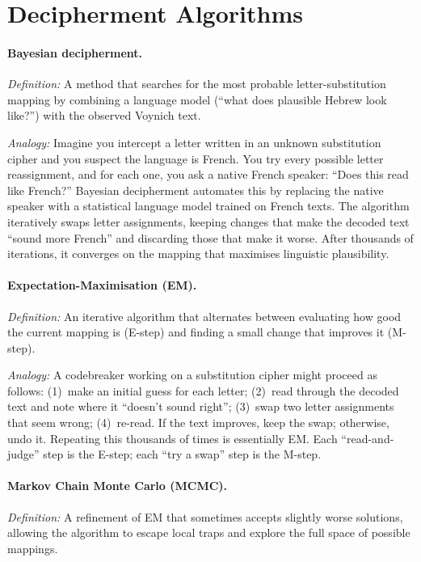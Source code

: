\documentclass[11pt,a4paper]{article}
\begin{document}
\section{Decipherment Algorithms}

\paragraph{Bayesian decipherment.}
\textit{Definition:} A method that searches for the most probable letter-substitution mapping by combining a language model (``what does plausible Hebrew look like?'') with the observed Voynich text.

\textit{Analogy:} Imagine you intercept a letter written in an unknown substitution cipher and you suspect the language is French.  You try every possible letter reassignment, and for each one, you ask a native French speaker: ``Does this read like French?''  Bayesian decipherment automates this by replacing the native speaker with a statistical language model trained on French texts.  The algorithm iteratively swaps letter assignments, keeping changes that make the decoded text ``sound more French'' and discarding those that make it worse.  After thousands of iterations, it converges on the mapping that maximises linguistic plausibility.

\paragraph{Expectation-Maximisation (EM).}
\textit{Definition:} An iterative algorithm that alternates between evaluating how good the current mapping is (E-step) and finding a small change that improves it (M-step).

\textit{Analogy:} A codebreaker working on a substitution cipher might proceed as follows: (1)~make an initial guess for each letter; (2)~read through the decoded text and note where it ``doesn't sound right''; (3)~swap two letter assignments that seem wrong; (4)~re-read.  If the text improves, keep the swap; otherwise, undo it.  Repeating this thousands of times is essentially EM.  Each ``read-and-judge'' step is the E-step; each ``try a swap'' step is the M-step.

\paragraph{Markov Chain Monte Carlo (MCMC).}
\textit{Definition:} A refinement of EM that sometimes accepts slightly worse solutions, allowing the algorithm to escape local traps and explore the full space of possible mappings.
\end{document}
